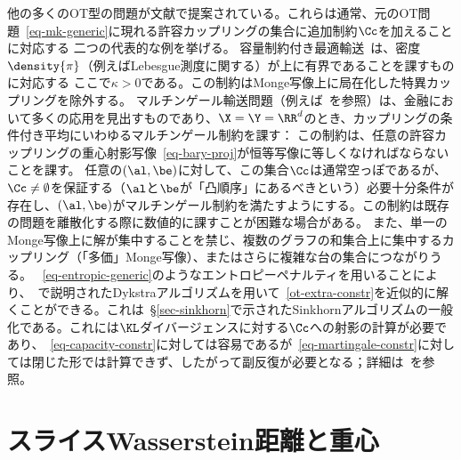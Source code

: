 他の多くのOT型の問題が文献で提案されている。これらは通常、元のOT問題~\eqref{eq-mk-generic}に現れる許容カップリングの集合に追加制約$\Cc$を加えることに対応する
二つの代表的な例を挙げる。
%
容量制約付き最適輸送~\citep{km1}は、密度$\density{\pi}$（例えばLebesgue測度に関する）が上に有界であることを課すものに対応する
\eql{\label{eq-capacity-constr}
	\Cc = \enscond{ \pi }{ \density{\pi} \leq \kappa }
}
ここで$\kappa>0$である。この制約はMonge写像上に局在化した特異カップリングを除外する。
%
マルチンゲール輸送問題（例えば~\citet{GalichonMartingale,dolinsky2014martingale,TanTouzi,beiglbock2013model}を参照）は、金融において多くの応用を見出すものであり、$\X=\Y=\RR^d$のとき、カップリングの条件付き平均にいわゆるマルチンゲール制約を課す：
この制約は、任意の許容カップリングの重心射影写像~\eqref{eq-bary-proj}が恒等写像に等しくなければならないことを課す。
%
任意の$(\al,\be)$に対して、この集合$\Cc$は通常空っぽであるが、$\Cc \neq \emptyset$を保証する（$\al$と$\be$が「凸順序」にあるべきという）必要十分条件が存在し、$(\al,\be)$がマルチンゲール制約を満たすようにする。この制約は既存の問題を離散化する際に数値的に課すことが困難な場合がある。
%
また、単一のMonge写像上に解が集中することを禁じ、複数のグラフの和集合上に集中するカップリング（「多価」Monge写像）、またはさらに複雑な台の集合につながりうる。
%
~\eqref{eq-entropic-generic}のようなエントロピーペナルティを用いることにより、~\citet{2015-benamou-cisc}で説明されたDykstraアルゴリズムを用いて~\eqref{ot-extra-constr}を近似的に解くことができる。これは~\S\ref{sec-sinkhorn}で示されたSinkhornアルゴリズムの一般化である。これには$\KL$ダイバージェンスに対する$\Cc$への射影の計算が必要であり、~\eqref{eq-capacity-constr}に対しては容易であるが~\eqref{eq-martingale-constr}に対しては閉じた形では計算できず、したがって副反復が必要となる；詳細は~\citep{guo2017computational}を参照。


\section{スライスWasserstein距離と重心}\label{sec-sliced}

